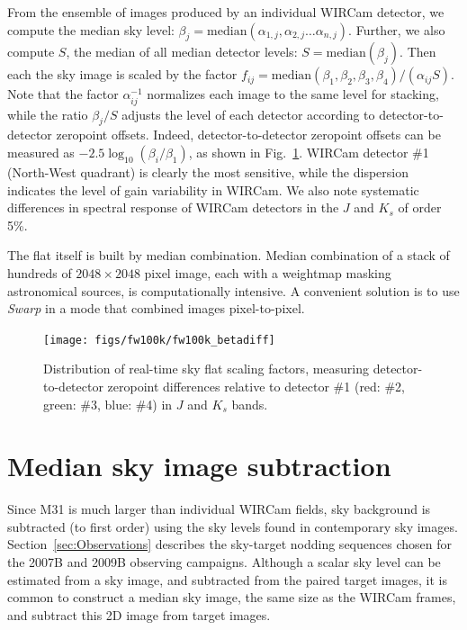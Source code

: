 \documentclass[iop]{emulateapj}
\newcommand{\sw}[1]{\textit{#1}} %
\newcommand{\Fig}[1]{Fig.~\ref{fig:#1}}  %
\begin{document}
From the ensemble of images produced by an individual WIRCam detector, we compute the median sky level: $\beta_j = \mathrm{median}(\alpha_{1,j}, \alpha_{2,j}\ldots \alpha_{n,j} )$.
Further, we also compute $S$, the median of all median detector levels: $S=\mathrm{median}(\beta_j)$.
Then each the sky image is scaled by the factor $f_{ij} = \mathrm{median}(\beta_1, \beta_2, \beta_3, \beta_4) / (\alpha_{ij} S)$.
Note that the factor $\alpha_{ij}^{-1}$ normalizes each image to the same level for stacking, while the ratio $\beta_j / S$ adjusts the level of each detector according to detector-to-detector zeropoint offsets.
Indeed, detector-to-detector zeropoint offsets can be measured as $-2.5 \log_{10}(\beta_i / \beta_1)$, as shown in \Fig{fw100k_zpdiff}.
WIRCam detector \#1 (North-West quadrant) is clearly the most sensitive, while the dispersion indicates the level of gain variability in WIRCam.
We also note systematic differences in spectral response of WIRCam detectors in the $J$ and $K_s$ of order 5\%.

The flat itself is built by median combination.
Median combination of a stack of hundreds of $2048\times2048$ pixel image, each with a weightmap masking astronomical sources, is computationally intensive.
A convenient solution is to use \sw{Swarp} \citep[an image-mosaicing software package,][]{Bertin:2002} in a mode that combined images pixel-to-pixel.

\begin{figure}[t]
\centering
\texttt{[image: figs/fw100k/fw100k\_betadiff]}
\caption{Distribution of real-time sky flat scaling factors, measuring detector-to-detector zeropoint differences relative to detector \#1 (red: \#2, green: \#3, blue: \#4) in $J$ and $K_s$ bands.
}
\label{fig:fw100k_zpdiff}
\end{figure}

\section{Median sky image subtraction}
\label{sec:mediansky}

Since M31 is much larger than individual WIRCam fields, sky background is subtracted (to first order) using the sky levels found in contemporary sky images.
Section~\ref{sec:Observations} describes the sky-target nodding sequences chosen for the 2007B and 2009B observing campaigns. 
Although a scalar sky level can be estimated from a sky image, and subtracted from the paired target images, it is common to construct a median sky image, the same size as the WIRCam frames, and subtract this 2D image from target images.
\end{document}
